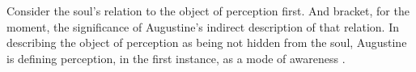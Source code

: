 \documentclass[12pt]{article}
\begin{document}
Consider the soul's relation to the object of perception first. And bracket, for the moment, the significance of Augustine's indirect description of that relation. In describing the object of perception as being not hidden from the soul, Augustine is defining perception, in the first instance, as a mode of awareness \citep[275]{Brittain:2002hl}. 

%
%
\end{document}

